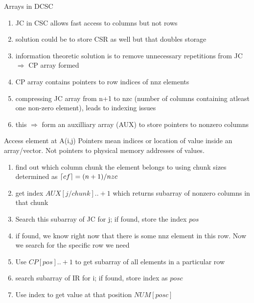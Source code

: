 \documentclass[12pt, usenames, dvipsnames]{beamer}
\DeclarePairedDelimiter{\ceil}{\lceil}{\rceil}
\begin{document}
\begin{frame}{Arrays in DCSC}
	\begin{enumerate}
		\item JC in CSC allows fast access to columns but not rows
		\item solution could be to store CSR as well but that doubles storage
		\item information theoretic solution is to remove unnecessary repetitions from JC $\Rightarrow$ CP array formed
		\item CP array contains pointers to row indices of nnz elements
		\item compressing JC array from n+1 to nzc (number of columns containing atleast one non-zero element), leads to indexing issues
		\item this $\Rightarrow$ form an auxilliary array (AUX) to store pointers to nonzero columns
	\end{enumerate}
\end{frame}

\begin{frame}{Access element at A(i,j)}
Pointers mean indices or location of value inside an array/vector. Not pointers to physical memory addresses of values.
	\begin{enumerate} 
		\item find out which column chunk the element belongs to using chunk sizes determined as $\ceil{cf} = (n+1)/nzc$
		\item get index $AUX[j/chunk]..+1$ which returns subarray of nonzero columns in that chunk
		\item Search this subarray of JC for j; if found, store the index $pos$
		\item if found, we know right now that there is some nnz element in this row. Now we search for the specific row we need
		\item Use $CP[pos]..+1$ to get subarray of all elements in a particular row
		\item search subarray of IR for i; if found, store index as $posc$
		\item Use index to get value at that position $NUM[posc]$
	\end{enumerate}
\end{frame}
\end{document}
